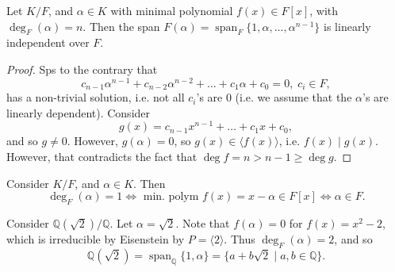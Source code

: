\documentclass[notoc,notitlepage,nobib]{tufte-book}
\DeclareMathOperator{\Span}{span}
\begin{document}
\begin{propo}\label{propo:span_of_an_extension_if_linearly_independent}
  Let $K / F$, and $\alpha \in K$ with minimal polynomial $f(x) \in F[x]$, with $\deg_F(\alpha) = n$. Then
  the span $F(\alpha) = \Span_F \{ 1, \alpha, \ldots, \alpha^{n - 1} \}$ is linearly independent over $F$.
\end{propo}

\begin{proof}
  Sps to the contrary that
  \begin{equation*}
    c_{n - 1} \alpha^{n - 1} + c_{n - 2} \alpha^{n - 2} + \hdots + c_1 \alpha + c_0 = 0, \; c_i \in F,
  \end{equation*}
  has a non-trivial solution, i.e. not all $c_i$'s are $0$ (i.e. we assume that the $\alpha$'s are linearly
  dependent). Consider
  \begin{equation*}
    g(x) = c_{n - 1} x^{n - 1} + \hdots + c_1 x + c_0,
  \end{equation*}
  and so $g \neq 0$. However, $g(\alpha) = 0$, so $g(x) \in \langle f(x) \rangle$, i.e. $f(x) \mid g(x)$.
  However, that contradicts the fact that $\deg f = n > n - 1 \geq \deg g$.
\end{proof}

\begin{eg}
  Consider $K / F$, and $\alpha \in K$. Then
  \begin{equation*}
    \deg_F(\alpha) = 1 \iff \text{ min. polym } f(x) = x - \alpha \in F[x] \iff \alpha \in F.
  \end{equation*}
\end{eg}

\begin{eg}
  Consider $\mathbb{Q}(\sqrt{2}) / \mathbb{Q}$. Let $\alpha = \sqrt{2}$. Note that $f(\alpha) = 0$ for
  $f(x) = x^2 - 2$, which is irreducible by Eisenstein by $P = \langle 2 \rangle$. Thus 
  $\deg_F(\alpha) = 2$, and so
  \begin{equation*}
    \mathbb{Q}(\sqrt{2}) = \Span_{\mathbb{Q}} \{ 1, \alpha \} = \{ a + b \sqrt{2} \mid a, b \in \mathbb{Q} \}.
  \end{equation*}
\end{eg}
\end{document}
